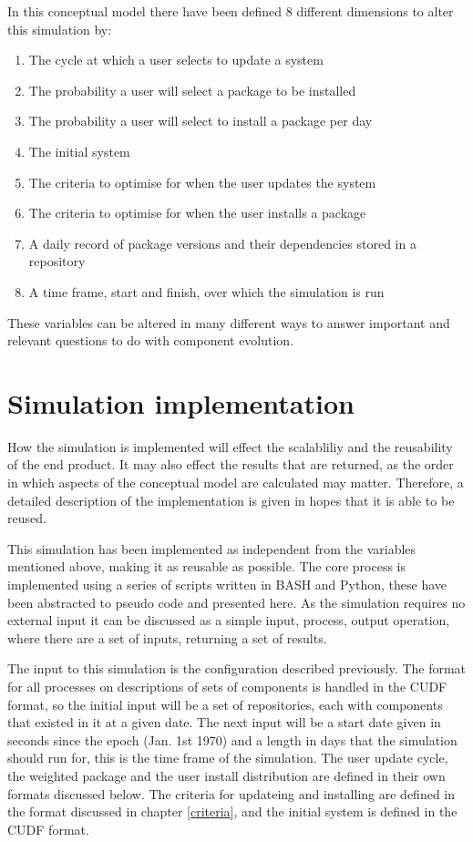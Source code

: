 In this conceptual model there have been defined 8 different dimensions to alter this simulation by:
\begin{enumerate}
  \item The cycle at which a user selects to update a system
  \item The probability a user will select a package to be installed
  \item The probability a user will select to install a package per day
  \item The initial system
  \item The criteria to optimise for when the user updates the system
  \item The criteria to optimise for when the user installs a package
  \item A daily record of package versions and their dependencies stored in a repository
  \item A time frame, start and finish, over which the simulation is run
\end{enumerate}

These variables can be altered in many different ways to answer important and relevant questions to do with component evolution.

\section{Simulation implementation}
How the simulation is implemented will effect the scalabliliy and the reusability of the end product.
It may also effect the results that are returned, as the order in which aspects of the conceptual model are calculated may matter.
Therefore, a detailed description of the implementation is given in hopes that it is able to be reused.

This simulation has been implemented as independent from the variables mentioned above, making it as reusable as possible.
The core process is implemented using a series of scripts written in BASH and Python,
these have been abstracted to pseudo code and presented here.
As the simulation requires no external input it can be discussed as a simple input, process, output operation,
where there are a set of inputs, returning a set of results.

The input to this simulation is the configuration described previously.
The format for all processes on descriptions of sets of components is handled in the CUDF format,
so the initial input will be a set of repositories, each with components that existed in it at a given date.
The next input will be a start date given in seconds since the epoch (Jan. 1st 1970) and a length in days that the simulation should run for, this is the time frame of the simulation.
The user update cycle, the weighted package and the user install distribution are defined in their own formats discussed below.
The criteria for updateing and installing are defined in the format discussed in chapter \ref{criteria},
and the initial system is defined in the CUDF format.

